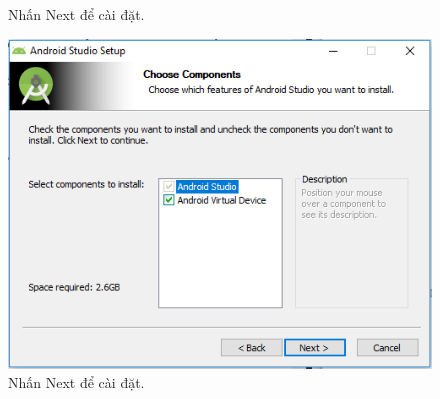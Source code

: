 \begin{enumerate}
\begin{center}
\begin{figure}[htp]
\begin{center}
    \end{center}
    \caption{Nhấn Next để cài đặt.}
    \label{refhinh1}
    \end{figure}
\end{center}
\newpage
\begin{center}
    \begin{figure}[htp]
    \begin{center}
     \includegraphics[scale=0.6]{image3/caidat2}
    \end{center}
    \caption{Nhấn Next để cài đặt.}
    \label{refhinh1}
    \end{figure}
\end{center}


\end{enumerate}
